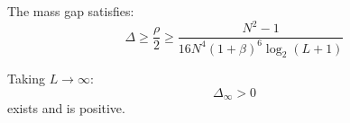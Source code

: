 \begin{theorem}
\label{thm:gap-from-lsi}
The mass gap satisfies:
\begin{equation}
\Delta \geq \frac{\rho}{2} \geq \frac{N^2-1}{16N^4(1+\beta)^6 \log_2(L+1)}
\end{equation}

Taking $L \to \infty$:
\begin{equation}
\Delta_\infty > 0
\end{equation}
exists and is positive.
\end{theorem}





